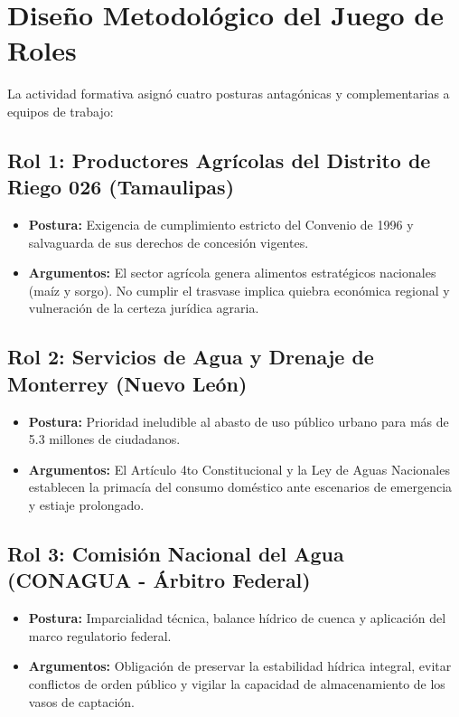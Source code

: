 \documentclass[spanish,letterpaper,oneside]{article}
\begin{document}
\section{Diseño Metodológico del Juego de Roles}
La actividad formativa asignó cuatro posturas antagónicas y complementarias a equipos de trabajo:

\subsection{Rol 1: Productores Agrícolas del Distrito de Riego 026 (Tamaulipas)}
\begin{itemize}
    \item \textbf{Postura:} Exigencia de cumplimiento estricto del Convenio de 1996 y salvaguarda de sus derechos de concesión vigentes.
    \item \textbf{Argumentos:} El sector agrícola genera alimentos estratégicos nacionales (maíz y sorgo). No cumplir el trasvase implica quiebra económica regional y vulneración de la certeza jurídica agraria.
\end{itemize}

\subsection{Rol 2: Servicios de Agua y Drenaje de Monterrey (Nuevo León)}
\begin{itemize}
    \item \textbf{Postura:} Prioridad ineludible al abasto de uso público urbano para más de 5.3 millones de ciudadanos.
    \item \textbf{Argumentos:} El Artículo 4to Constitucional y la Ley de Aguas Nacionales establecen la primacía del consumo doméstico ante escenarios de emergencia y estiaje prolongado.
\end{itemize}

\subsection{Rol 3: Comisión Nacional del Agua (CONAGUA - Árbitro Federal)}
\begin{itemize}
    \item \textbf{Postura:} Imparcialidad técnica, balance hídrico de cuenca y aplicación del marco regulatorio federal.
    \item \textbf{Argumentos:} Obligación de preservar la estabilidad hídrica integral, evitar conflictos de orden público y vigilar la capacidad de almacenamiento de los vasos de captación.
\end{itemize}
\end{document}
